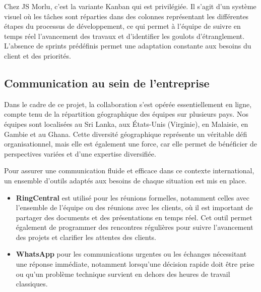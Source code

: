 {\vspace{0.3cm}

Chez JS Morlu, c'est la variante Kanban qui est privilégiée. Il s'agit d'un système visuel où les tâches sont réparties dans des colonnes représentant les différentes étapes du processus de développement, ce qui permet à l'équipe de suivre en temps réel l'avancement des travaux et d'identifier les goulots d'étranglement. L'absence de sprints prédéfinis permet une adaptation constante aux besoins du client et des priorités.

\subsection*{Communication au sein de l'entreprise} \label{comm_au_sein_de_l_entreprise}

Dans le cadre de ce projet, la collaboration s'est opérée essentiellement en ligne, compte tenu de la répartition géographique des équipes sur plusieurs pays. Nos équipes sont localisées au Sri Lanka, aux États-Unis (Virginie), en Malaisie, en Gambie et au Ghana. Cette diversité géographique représente un véritable défi organisationnel, mais elle est également une force, car elle permet de bénéficier de perspectives variées et d'une expertise diversifiée.

\vspace{0.35cm}

Pour assurer une communication fluide et efficace dans ce contexte international, un ensemble d'outils adaptés aux besoins de chaque situation est mis en place. 

\begin{itemize}
    \item \textbf{RingCentral} est utilisé pour les réunions formelles, notamment celles avec l'ensemble de l'équipe ou des réunions avec les clients, où il est important de partager des documents et des présentations en temps réel. Cet outil permet également de programmer des rencontres régulières pour suivre l'avancement des projets et clarifier les attentes des clients.

    \item \textbf{WhatsApp} pour les communications urgentes ou les échanges nécessitant une réponse immédiate, notamment lorsqu'une décision rapide doit être prise ou qu'un problème technique survient en dehors des heures de travail classiques.
\end{itemize}

\vspace{0.35cm}

}
